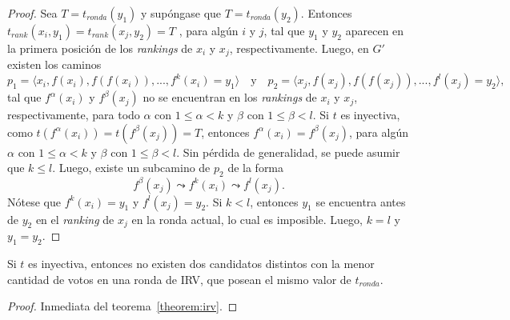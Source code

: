 \begin{proof}
    Sea $T = t_{ronda}(y_1)$ y sup\'ongase que $T = t_{ronda}(y_2)$. Entonces $t_{rank}(x_{i}, y_1) = t_{rank}(x_{j}, y_2) = T$ , para alg\'un $i$ y $j$, tal que $y_1$ y $y_2$ aparecen en la primera posici\'on de los \textit{rankings} de $x_{i}$ y $x_{j}$, respectivamente. Luego, en $G'$ existen los caminos
    $$
    p_1 = \langle x_{i}, f(x_i), f(f(x_i)), ..., f^k(x_i) = y_1 \rangle \quad \text{y} \quad p_2 = \langle x_{j}, f(x_j), f(f(x_j)), ..., f^l(x_j) = y_2 \rangle,
    $$
    tal que $f^\alpha(x_i)$ y $f^\beta(x_j)$ no se encuentran en los \textit{rankings} de $x_i$ y $x_j$, respectivamente, para todo $\alpha$ con $ 1 \leq \alpha < k$ y $\beta$ con $ 1 \leq \beta < l$. Si $t$ es inyectiva, como $t(f^\alpha(x_i)) = t(f^\beta(x_j)) = T$, entonces $f^\alpha(x_i) = f^\beta(x_j)$, para alg\'un $\alpha$ con $ 1 \leq \alpha < k$ y $\beta$ con $ 1 \leq \beta < l$. Sin p\'erdida de generalidad, se puede asumir que $k \leq l$. Luego, existe un subcamino de $p_2$ de la forma
    $$
        f^\beta(x_j) \leadsto f^k(x_i) \leadsto f^l(x_j).
    $$
    N\'otese que $f^k(x_i) = y_1$ y $f^l(x_j) = y_2$.  Si $k<l$, entonces $y_1$ se encuentra antes de $y_2$ en el \textit{ranking} de $x_j$ en la ronda actual, lo cual es imposible. Luego, $k=l$ y $y_1 = y_2$.
\end{proof}

\begin{corollary}\label{corollary:irv}
    Si $t$ es inyectiva, entonces no existen dos candidatos distintos con la menor cantidad de votos en una ronda de IRV, que posean el mismo valor de $t_{ronda}$.
\end{corollary}

\begin{proof}
    Inmediata del teorema~\ref{theorem:irv}.
\end{proof}


